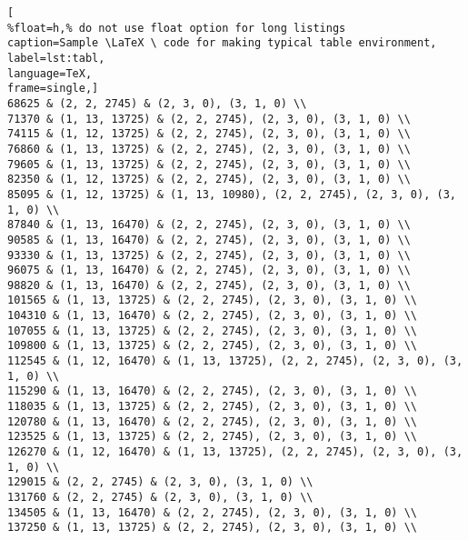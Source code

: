\begin{lstlisting}[
%float=h,% do not use float option for long listings
caption=Sample \LaTeX \ code for making typical table environment, 
label=lst:tabl,
language=TeX,
frame=single,]
68625 & (2, 2, 2745) & (2, 3, 0), (3, 1, 0) \\
71370 & (1, 13, 13725) & (2, 2, 2745), (2, 3, 0), (3, 1, 0) \\
74115 & (1, 12, 13725) & (2, 2, 2745), (2, 3, 0), (3, 1, 0) \\
76860 & (1, 13, 13725) & (2, 2, 2745), (2, 3, 0), (3, 1, 0) \\
79605 & (1, 13, 13725) & (2, 2, 2745), (2, 3, 0), (3, 1, 0) \\
82350 & (1, 12, 13725) & (2, 2, 2745), (2, 3, 0), (3, 1, 0) \\
85095 & (1, 12, 13725) & (1, 13, 10980), (2, 2, 2745), (2, 3, 0), (3, 1, 0) \\
87840 & (1, 13, 16470) & (2, 2, 2745), (2, 3, 0), (3, 1, 0) \\
90585 & (1, 13, 16470) & (2, 2, 2745), (2, 3, 0), (3, 1, 0) \\
93330 & (1, 13, 13725) & (2, 2, 2745), (2, 3, 0), (3, 1, 0) \\
96075 & (1, 13, 16470) & (2, 2, 2745), (2, 3, 0), (3, 1, 0) \\
98820 & (1, 13, 16470) & (2, 2, 2745), (2, 3, 0), (3, 1, 0) \\
101565 & (1, 13, 13725) & (2, 2, 2745), (2, 3, 0), (3, 1, 0) \\
104310 & (1, 13, 16470) & (2, 2, 2745), (2, 3, 0), (3, 1, 0) \\
107055 & (1, 13, 13725) & (2, 2, 2745), (2, 3, 0), (3, 1, 0) \\
109800 & (1, 13, 13725) & (2, 2, 2745), (2, 3, 0), (3, 1, 0) \\
112545 & (1, 12, 16470) & (1, 13, 13725), (2, 2, 2745), (2, 3, 0), (3, 1, 0) \\
115290 & (1, 13, 16470) & (2, 2, 2745), (2, 3, 0), (3, 1, 0) \\
118035 & (1, 13, 13725) & (2, 2, 2745), (2, 3, 0), (3, 1, 0) \\
120780 & (1, 13, 16470) & (2, 2, 2745), (2, 3, 0), (3, 1, 0) \\
123525 & (1, 13, 13725) & (2, 2, 2745), (2, 3, 0), (3, 1, 0) \\
126270 & (1, 12, 16470) & (1, 13, 13725), (2, 2, 2745), (2, 3, 0), (3, 1, 0) \\
129015 & (2, 2, 2745) & (2, 3, 0), (3, 1, 0) \\
131760 & (2, 2, 2745) & (2, 3, 0), (3, 1, 0) \\
134505 & (1, 13, 16470) & (2, 2, 2745), (2, 3, 0), (3, 1, 0) \\
137250 & (1, 13, 13725) & (2, 2, 2745), (2, 3, 0), (3, 1, 0) \\

\end{lstlisting}

